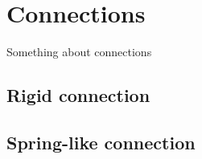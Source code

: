 \chapter{Connections}\label{ch:connections}
Something about connections

\section{Rigid connection}

\section{Spring-like connection}